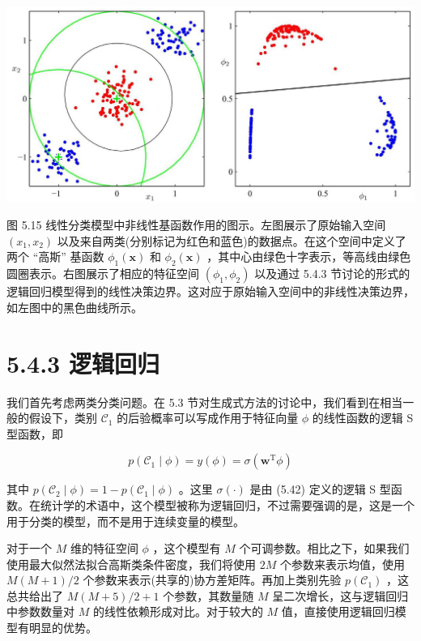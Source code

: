 \documentclass[10pt]{report}
\begin{document}
\begin{center}
\includegraphics[max width=1.0\textwidth]{images/0194e279-9b28-703a-88f4-c3ac21e2010d_178_200_356_1323_635_0.jpg}
\end{center}
\hspace*{3em} 

图 5.15 线性分类模型中非线性基函数作用的图示。左图展示了原始输入空间 \(\left( {{x}_{1},{x}_{2}}\right)\) 以及来自两类(分别标记为红色和蓝色)的数据点。在这个空间中定义了两个 “高斯” 基函数 \({\phi }_{1}\left( \mathbf{x}\right)\) 和 \({\phi }_{2}\left( \mathbf{x}\right)\) ，其中心由绿色十字表示，等高线由绿色圆圈表示。右图展示了相应的特征空间 \(\left( {{\phi }_{1},{\phi }_{2}}\right)\) 以及通过 5.4.3 节讨论的形式的逻辑回归模型得到的线性决策边界。这对应于原始输入空间中的非线性决策边界，如左图中的黑色曲线所示。

\section*{5.4.3 逻辑回归}

我们首先考虑两类分类问题。在 5.3 节对生成式方法的讨论中，我们看到在相当一般的假设下，类别 \({\mathcal{C}}_{1}\) 的后验概率可以写成作用于特征向量 \(\phi\) 的线性函数的逻辑 S 型函数，即

\[
p\left( {{\mathcal{C}}_{1} \mid  \phi }\right)  = y\left( \phi \right)  = \sigma \left( {{\mathbf{w}}^{\mathrm{T}}\phi }\right)  \tag{5.71}
\]

其中 \(p\left( {{\mathcal{C}}_{2} \mid  \phi }\right)  = 1 - p\left( {{\mathcal{C}}_{1} \mid  \phi }\right)\) 。这里 \(\sigma \left( \cdot \right)\) 是由 (5.42) 定义的逻辑 S 型函数。在统计学的术语中，这个模型被称为逻辑回归，不过需要强调的是，这是一个用于分类的模型，而不是用于连续变量的模型。

对于一个 \(M\) 维的特征空间 \(\phi\) ，这个模型有 \(M\) 个可调参数。相比之下，如果我们使用最大似然法拟合高斯类条件密度，我们将使用 \({2M}\) 个参数来表示均值，使用 \(M\left( {M + 1}\right) /2\) 个参数来表示(共享的)协方差矩阵。再加上类别先验 \(p\left( {\mathcal{C}}_{1}\right)\) ，这总共给出了 \(M\left( {M + 5}\right) /2 + 1\) 个参数，其数量随 \(M\) 呈二次增长，这与逻辑回归中参数数量对 \(M\) 的线性依赖形成对比。对于较大的 \(M\) 值，直接使用逻辑回归模型有明显的优势。
\end{document}
